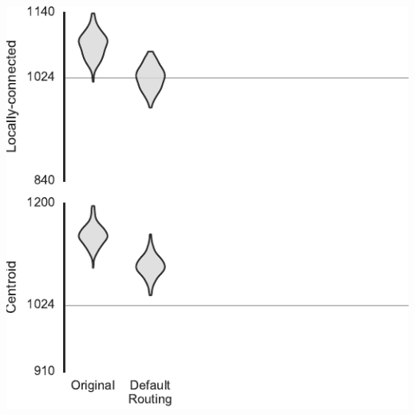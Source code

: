 \documentclass[t]{beamer}
\begin{document}
\begin{frame}[plain]{}
  \begin{center}
    \includegraphics[page=1]{../experiments/presentation_plots}
  \end{center}
\end{frame}
\end{document}

